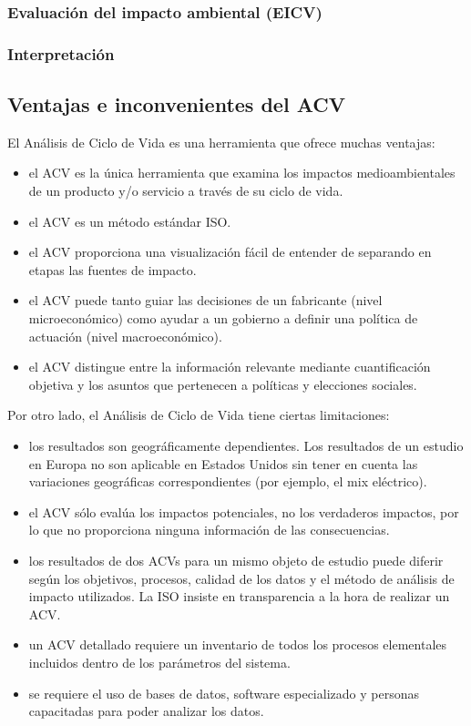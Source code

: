 \subsubsection{Evaluación del impacto ambiental (EICV)}
\subsubsection{Interpretación}

\subsection{Ventajas e inconvenientes del ACV}

El Análisis de Ciclo de Vida es una herramienta que ofrece muchas ventajas:
\begin{itemize}
  \item el ACV es la única herramienta que examina los impactos medioambientales de un producto y/o servicio a través de su ciclo de vida.
  \item el ACV es un método estándar ISO.
  \item el ACV proporciona una visualización fácil de entender de separando en etapas las fuentes de impacto.
  \item el ACV puede tanto guiar las decisiones de un fabricante (nivel microeconómico) como ayudar a un gobierno a definir una política de actuación (nivel macroeconómico).
  \item el ACV distingue entre la información relevante mediante cuantificación objetiva y los asuntos que pertenecen a políticas y elecciones sociales.
\end{itemize}

Por otro lado, el Análisis de Ciclo de Vida tiene ciertas limitaciones:
\begin{itemize}
  \item los resultados son geográficamente dependientes. Los resultados de un estudio en Europa no son aplicable en Estados Unidos sin tener en cuenta las variaciones geográficas correspondientes (por ejemplo, el mix eléctrico).
  \item el ACV sólo evalúa los impactos potenciales, no los verdaderos impactos, por lo que no proporciona ninguna información de las consecuencias.
  \item los resultados de dos ACVs para un mismo objeto de estudio puede diferir según los objetivos, procesos, calidad de los datos y el método de análisis de impacto utilizados. La ISO insiste en transparencia a la hora de realizar un ACV.
  \item un ACV detallado requiere un inventario de todos los procesos elementales incluidos dentro de los parámetros del sistema.
  \item se requiere el uso de bases de datos, software especializado y personas capacitadas para poder analizar los datos.
\end{itemize}

